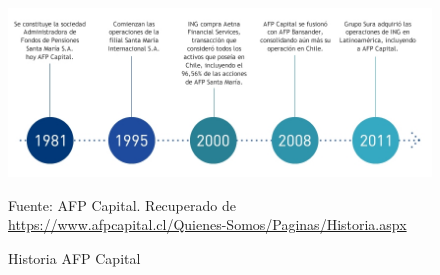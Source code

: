 \begin{figure}[H]
    \begin{minipage}[t]{0.9\textwidth}
        \caption{Historia AFP Capital}
        \label{historia-afp}        
    \end{minipage}

    \vspace{10pt}

    \begin{minipage}[b]{1.1\textwidth}
        \centering
        \includegraphics[width=\textwidth]{img/historia-afp-capital.jpg}        
    \end{minipage}

    \begin{minipage}[t]{0.9\textwidth}
        Fuente: AFP Capital. Recuperado de \url{https://www.afpcapital.cl/Quienes-Somos/Paginas/Historia.aspx}
    \end{minipage}
\end{figure}